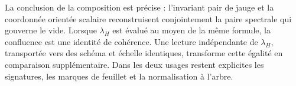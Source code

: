 La conclusion de la composition est précise : l’invariant pair de jauge
et la coordonnée orientée scalaire reconstruisent conjointement la paire
spectrale qui gouverne le vide. Lorsque $\lambda_H$ est évalué au moyen de la
même formule, la confluence est une identité de cohérence. Une lecture
indépendante de $\lambda_H$, transportée vers des schéma et échelle identiques,
transforme cette égalité en comparaison supplémentaire. Dans les deux usages restent
explicites les signatures, les marques de feuillet et la normalisation à l’arbre.
